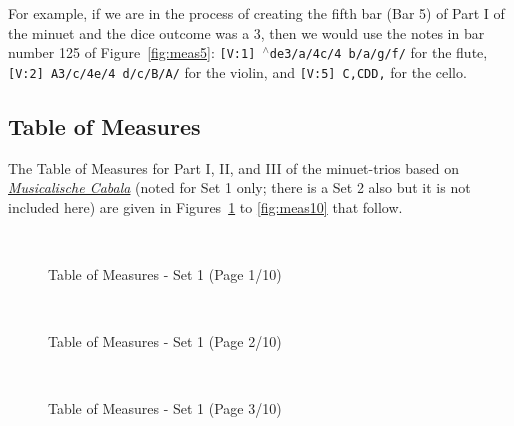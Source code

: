 \documentclass[a4paper,x11names,svgnames,10pt]{article}
\begin{document}
{For example, if we are in the process of creating the fifth bar (Bar 5) of Part I of the minuet and the dice outcome was a 3, then we would use the notes in bar number 125 of Figure~\ref{fig:meas5}: {\tt [V:1] {$^\wedge$d}e3/a/4c/4 b/a/g/f/} for the flute, {\tt [V:2] A3/c/4e/4 d/c/B/A/} for the violin, and {\tt [V:5] C,CDD,} for the cello.


\subsection{Table of Measures}\label{tabMeas}

The Table of Measures for Part I, II, and III of the minuet-trios based on \href{https://imslp.org/wiki/Musicalische_Cabala_(Schola\%2C_Franciscus)}{{\em Musicalische Cabala}} (noted for Set 1 only; there is a Set 2 also but it is not included here) are given in Figures~\ref{fig:meas1} to  \ref{fig:meas10} that follow. 

${}_{}$\\
\begin{figure}[H]
	\centering
	\def\svgwidth{0.975\columnwidth}
 	
	\caption{Table of Measures - Set 1 (Page 1/10)}
	\label{fig:meas1}
\end{figure}

${}_{}$\\
\vspace*{0.5in}
\begin{figure}[H]
	\centering
	\def\svgwidth{0.975\columnwidth}
 	
	\caption{Table of Measures - Set 1 (Page 2/10)}
	\label{fig:meas2}
\end{figure}

${}_{}$\\
\vspace*{0.5in}
\begin{figure}[H]
	\centering
	\def\svgwidth{0.975\columnwidth}
 	
	\caption{Table of Measures - Set 1 (Page 3/10)}
	\label{fig:meas3}
\end{figure}

}
\end{document}
